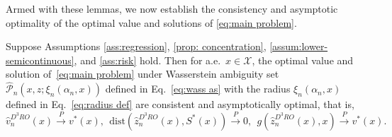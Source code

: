 \documentclass[onefignum,onetabnum]{siamart251216}
\begin{document}
Armed with these lemmas, we now establish the consistency and asymptotic optimality of the optimal value and solutions of \eqref{eq:main problem}. 

\begin{theorem} \label{thm:consistency-wass}
Suppose Assumptions \ref{ass:regression}, \ref{prop: concentration}, \ref{assum:lower-semicontinuous}, and \ref{ass:risk} hold. Then for a.e.\ $x \in \mathcal{X}$, the optimal value and solution of\ \eqref{eq:main problem} under Wasserstein ambiguity set $\hat{\mathcal{P}}_n(x,z;\xi_n(\alpha_n,x))$ defined in Eq.~\eqref{eq:wass as} with the radius $\xi_n(\alpha_n,x)$ defined in Eq.~\eqref{eq:radius def} are consistent and asymptotically optimal, that is,
\[
\hat{v}_n^{D^3RO}(x) \xrightarrow{P} v^*(x),\  \ \text{dist}(\hat{z}_n^{D^3RO}(x),S^*(x)) \xrightarrow{P} 0,\ \  g(\hat{z}_n^{D^3RO}(x),x) \xrightarrow{P} v^*(x).
\]
\end{theorem}
\end{document}
